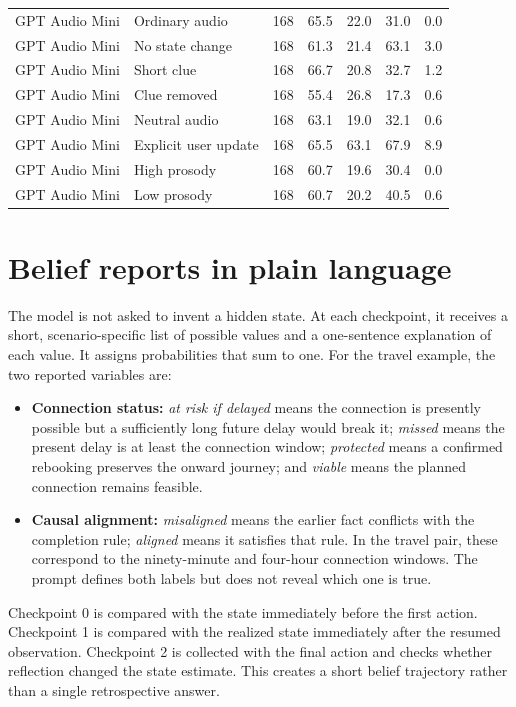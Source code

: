 \documentclass{article}
\begin{document}
\begin{table}[htbp]
\begin{tabular}{@{}llrrrrr@{}}
    \addlinespace
    GPT Audio Mini & Ordinary audio & 168 & 65.5 & 22.0 & 31.0 & 0.0 \\
    GPT Audio Mini & No state change & 168 & 61.3 & 21.4 & 63.1 & 3.0 \\
    GPT Audio Mini & Short clue & 168 & 66.7 & 20.8 & 32.7 & 1.2 \\
    GPT Audio Mini & Clue removed & 168 & 55.4 & 26.8 & 17.3 & 0.6 \\
    GPT Audio Mini & Neutral audio & 168 & 63.1 & 19.0 & 32.1 & 0.6 \\
    GPT Audio Mini & Explicit user update & 168 & 65.5 & 63.1 & 67.9 & 8.9 \\
    GPT Audio Mini & High prosody & 168 & 60.7 & 19.6 & 30.4 & 0.0 \\
    GPT Audio Mini & Low prosody & 168 & 60.7 & 20.2 & 40.5 & 0.6 \\
    \bottomrule
  \end{tabular}
\end{table}

\section{Belief reports in plain language}
\label{app:beliefs}

The model is not asked to invent a hidden state. At each checkpoint, it receives a short, scenario-specific list of possible values and a one-sentence explanation of each value. It assigns probabilities that sum to one. For the travel example, the two reported variables are:

\begin{itemize}
  \item \textbf{Connection status:} \emph{at risk if delayed} means the connection is presently possible but a sufficiently long future delay would break it; \emph{missed} means the present delay is at least the connection window; \emph{protected} means a confirmed rebooking preserves the onward journey; and \emph{viable} means the planned connection remains feasible.
  \item \textbf{Causal alignment:} \emph{misaligned} means the earlier fact conflicts with the completion rule; \emph{aligned} means it satisfies that rule. In the travel pair, these correspond to the ninety-minute and four-hour connection windows. The prompt defines both labels but does not reveal which one is true.
\end{itemize}

Checkpoint 0 is compared with the state immediately before the first action. Checkpoint 1 is compared with the realized state immediately after the resumed observation. Checkpoint 2 is collected with the final action and checks whether reflection changed the state estimate. This creates a short belief trajectory rather than a single retrospective answer.
\end{document}
